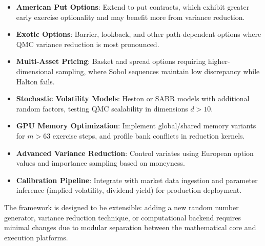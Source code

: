 \documentclass[11pt,a4paper]{article}
\begin{document}
\begin{itemize}
    \item \textbf{American Put Options}: Extend to put contracts, which exhibit greater early exercise optionality and may benefit more from variance reduction.
    \item \textbf{Exotic Options}: Barrier, lookback, and other path-dependent options where QMC variance reduction is most pronounced.
    \item \textbf{Multi-Asset Pricing}: Basket and spread options requiring higher-dimensional sampling, where Sobol sequences maintain low discrepancy while Halton fails.
    \item \textbf{Stochastic Volatility Models}: Heston or SABR models with additional random factors, testing QMC scalability in dimensions $d > 10$.
    \item \textbf{GPU Memory Optimization}: Implement global/shared memory variants for $m > 63$ exercise steps, and profile bank conflicts in reduction kernels.
    \item \textbf{Advanced Variance Reduction}: Control variates using European option values and importance sampling based on moneyness.
    \item \textbf{Calibration Pipeline}: Integrate with market data ingestion and parameter inference (implied volatility, dividend yield) for production deployment.
\end{itemize}

The framework is designed to be extensible: adding a new random number generator, variance reduction technique, or computational backend requires minimal changes due to modular separation between the mathematical core and execution platforms.
\end{document}

